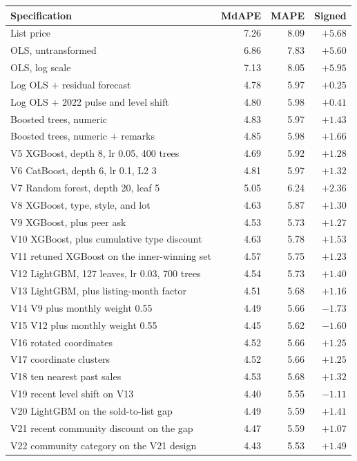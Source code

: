 \documentclass[11pt]{article}
\begin{document}
\begin{center}
\small
\begin{tabular}{p{8.6cm}rrr}
\toprule
Specification & MdAPE & MAPE & Signed \\
\midrule
List price & 7.26 & 8.09 & \(+5.68\) \\
OLS, untransformed & 6.86 & 7.83 & \(+5.60\) \\
OLS, log scale & 7.13 & 8.05 & \(+5.95\) \\
Log OLS \(+\) residual forecast & 4.78 & 5.97 & \(+0.25\) \\
Log OLS \(+\) 2022 pulse and level shift & 4.80 & 5.98 & \(+0.41\) \\
Boosted trees, numeric & 4.83 & 5.97 & \(+1.43\) \\
Boosted trees, numeric \(+\) remarks & 4.85 & 5.98 & \(+1.66\) \\
V5 XGBoost, depth 8, lr 0.05, 400 trees & 4.69 & 5.92 & \(+1.28\) \\
V6 CatBoost, depth 6, lr 0.1, L2 3 & 4.81 & 5.97 & \(+1.32\) \\
V7 Random forest, depth 20, leaf 5 & 5.05 & 6.24 & \(+2.36\) \\
V8 XGBoost, type, style, and lot & 4.63 & 5.87 & \(+1.30\) \\
V9 XGBoost, plus peer ask & 4.53 & 5.73 & \(+1.27\) \\
V10 XGBoost, plus cumulative type discount & 4.63 & 5.78 & \(+1.53\) \\
V11 retuned XGBoost on the inner-winning set & 4.57 & 5.75 & \(+1.23\) \\
V12 LightGBM, 127 leaves, lr 0.03, 700 trees & 4.54 & 5.73 & \(+1.40\) \\
V13 LightGBM, plus listing-month factor & 4.51 & 5.68 & \(+1.16\) \\
V14 V9 plus monthly weight 0.55 & 4.49 & 5.66 & \(-1.73\) \\
V15 V12 plus monthly weight 0.55 & 4.45 & 5.62 & \(-1.60\) \\
V16 rotated coordinates & 4.52 & 5.66 & \(+1.25\) \\
V17 coordinate clusters & 4.52 & 5.66 & \(+1.25\) \\
V18 ten nearest past sales & 4.53 & 5.68 & \(+1.32\) \\
V19 recent level shift on V13 & 4.40 & 5.55 & \(-1.11\) \\
V20 LightGBM on the sold-to-list gap & 4.49 & 5.59 & \(+1.41\) \\
V21 recent community discount on the gap & 4.47 & 5.59 & \(+1.07\) \\
V22 community category on the V21 design & 4.43 & 5.53 & \(+1.49\) \\
\bottomrule
\end{tabular}
\end{center}
\end{document}
